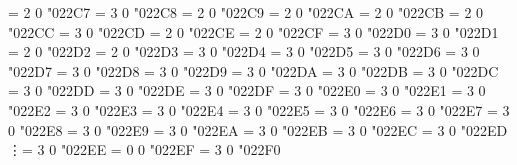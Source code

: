 \Umathchardef\divideontimes = 2 0 "022C7 %
\Umathchardef\bowtie = 3 0 "022C8 %
\Umathchardef\ltimes = 2 0 "022C9 %
\Umathchardef\rtimes = 2 0 "022CA %
\Umathchardef\leftthreetimes = 2 0 "022CB %
\Umathchardef\rightthreetimes = 2 0 "022CC %
\Umathchardef\backsimeq = 3 0 "022CD %
\Umathchardef\curlyvee = 2 0 "022CE %
\Umathchardef\curlywedge = 2 0 "022CF %
\Umathchardef\Subset = 3 0 "022D0 %
\Umathchardef\Supset = 3 0 "022D1 %
\Umathchardef\Cap = 2 0 "022D2 %
\Umathchardef\Cup = 2 0 "022D3 %
\Umathchardef\pitchfork = 3 0 "022D4 %
\Umathchardef\equalparallel = 3 0 "022D5 %
\Umathchardef\lessdot = 3 0 "022D6 %
\Umathchardef\gtrdot = 3 0 "022D7 %
\Umathchardef\lll = 3 0 "022D8 %
\Umathchardef\ggg = 3 0 "022D9 %
\Umathchardef\lesseqgtr = 3 0 "022DA %
\Umathchardef\gtreqless = 3 0 "022DB %
\Umathchardef\eqless = 3 0 "022DC %
\Umathchardef\eqgtr = 3 0 "022DD %
\Umathchardef\curlyeqprec = 3 0 "022DE %
\Umathchardef\curlyeqsucc = 3 0 "022DF %
\Umathchardef\npreccurlyeq = 3 0 "022E0 %
\Umathchardef\nsucccurlyeq = 3 0 "022E1 %
\Umathchardef\nsqsubseteq = 3 0 "022E2 %
\Umathchardef\nsqsupseteq = 3 0 "022E3 %
\Umathchardef\sqsubsetneq = 3 0 "022E4 %
\Umathchardef\sqsupsetneq = 3 0 "022E5 %
\Umathchardef\lnsim = 3 0 "022E6 %
\Umathchardef\gnsim = 3 0 "022E7 %
\Umathchardef\precnsim = 3 0 "022E8 %
\Umathchardef\succnsim = 3 0 "022E9 %
\Umathchardef\nvartriangleleft = 3 0 "022EA %
\Umathchardef\nvartriangleright = 3 0 "022EB %
\Umathchardef\ntrianglelefteq = 3 0 "022EC %
\Umathchardef\ntrianglerighteq = 3 0 "022ED %
\Umathchardef\vdots = 3 0 "022EE %
\Umathchardef\unicodecdots = 0 0 "022EF %
\Umathchardef\adots = 3 0 "022F0 %
